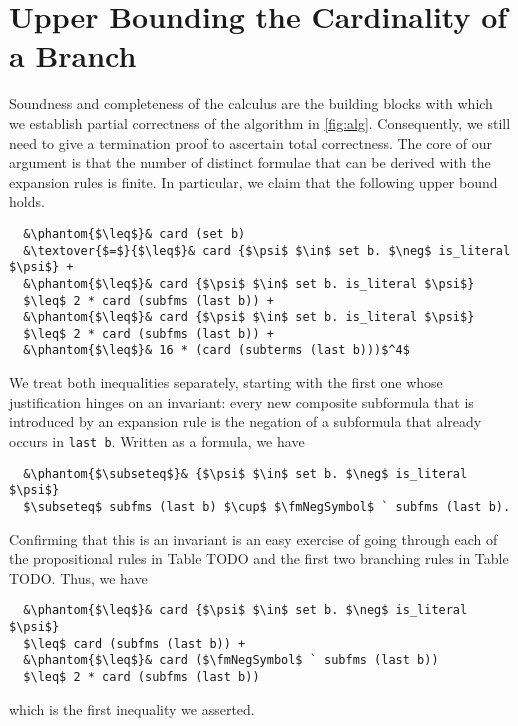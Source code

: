 \documentclass[sigplan,10pt,anonymous,review]{acmart}
\newcommand{\textover}[3][l]{%
 \makebox[\widthof{#3}][#1]{#2}%
}
\newcommand{\fmNegSymbol}{\boldsymbol{\neg}}
\begin{document}
\section{Upper Bounding the Cardinality of a Branch\label{sec:bound}}
Soundness and completeness of the calculus are the building blocks with which we establish partial correctness of the algorithm in \autoref{fig:alg}.
Consequently, we still need to give a termination proof to ascertain total correctness.
The core of our argument is that the number of distinct formulae that can be derived with the expansion rules is finite.
In particular, we claim that the following upper bound holds.
\begin{lstlisting}
  &\phantom{$\leq$}& card (set b)
  &\textover{$=$}{$\leq$}& card {$\psi$ $\in$ set b. $\neg$ is_literal $\psi$} +
  &\phantom{$\leq$}& card {$\psi$ $\in$ set b. is_literal $\psi$}
  $\leq$ 2 * card (subfms (last b)) +
  &\phantom{$\leq$}& card {$\psi$ $\in$ set b. is_literal $\psi$}
  $\leq$ 2 * card (subfms (last b)) +
  &\phantom{$\leq$}& 16 * (card (subterms (last b)))$^4$
\end{lstlisting}
We treat both inequalities separately, starting with the first one whose justification hinges on an invariant: 
every new composite subformula that is introduced by an expansion rule is the negation of a subformula that already occurs in \lstinline!last b!.
Written as a formula, we have
\begin{lstlisting}
  &\phantom{$\subseteq$}& {$\psi$ $\in$ set b. $\neg$ is_literal $\psi$}
  $\subseteq$ subfms (last b) $\cup$ $\fmNegSymbol$ ` subfms (last b).
\end{lstlisting}
Confirming that this is an invariant is an easy exercise of going through each of the propositional rules in Table TODO and the first two branching rules in Table TODO.
Thus, we have
\begin{lstlisting}
  &\phantom{$\leq$}& card {$\psi$ $\in$ set b. $\neg$ is_literal $\psi$}
  $\leq$ card (subfms (last b)) +
  &\phantom{$\leq$}& card ($\fmNegSymbol$ ` subfms (last b))
  $\leq$ 2 * card (subfms (last b))
\end{lstlisting}
which is the first inequality we asserted. 
\end{document}
